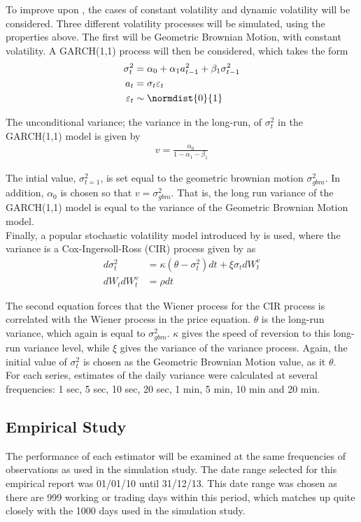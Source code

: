 \documentclass[12pt]{article}
\begin{document}
To improve upon \citet{Martens2007}, the cases of constant volatility and dynamic volatility will be
considered. Three different volatility processes will be simulated, using the properties above. The first will
be Geometric Brownian Motion, with constant volatility. A GARCH(1,1) process will then be considered, which
takes the form
\begin{align*}
  \sigma^2_t &= \alpha_0 + \alpha_1 a_{t-1}^2 + \beta_1 \sigma_{t-1}^2 \\
  a_t &= \sigma_t \varepsilon_t \\
  \varepsilon_t &\sim \normdist{0}{1} 
\end{align*}

The unconditional variance; the variance in the long-run, of $\sigma_t^2$ in the GARCH(1,1) model is given by
\begin{align*}
  v = \frac{\alpha_0}{1- \alpha_1 - \beta_1}
\end{align*}

The intial value, $\sigma^2_{t=1}$, is set equal to the geometric brownian motion $\sigma^2_{gbm}$. In
addition, $\alpha_0$ is chosen so that $v = \sigma^2_{gbm}$. That is, the long run variance of the GARCH(1,1)
model is equal to the variance of the Geometric Brownian Motion model. \\

Finally, a popular stochastic volatility model introduced by \citet{Heston1993} is used, where the variance is
a Cox-Ingersoll-Ross (CIR) process given by \citet{Wilmott2007} as
\begin{align*}
  d\sigma^2_t &= \kappa \left(\theta - \sigma^2_t \right) dt + \xi \sigma_t dW^v_t \\
  dW_t dW^v_t &= \rho dt
\end{align*}

The second equation forces that the Wiener process for the CIR process is correlated with the Wiener process
in the price equation. $\theta$ is the long-run variance, which again is equal to $\sigma^2_{gbm}$. $\kappa$
gives the speed of reversion to this long-run variance level, while $\xi$ gives the variance of the variance
process. Again, the initial value of $\sigma_t^2$ is chosen as the Geometric Brownian Motion value, as it
$\theta$. \\

For each series, estimates of the daily variance were calculated at several frequencies: 1 sec, 5 sec, 10 sec,
20 sec, 1 min, 5 min, 10 min and 20 min.

\subsection{Empirical Study}
The performance of each estimator will be examined at the same frequencies of observations as used in the
simulation study. The date range selected for this empirical report was 01/01/10 until 31/12/13. This date
range was chosen as there are 999 working or trading days within this period, which matches up quite closely
with the 1000 days used in the simulation study. \\
\end{document}
